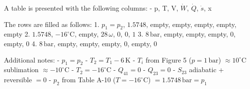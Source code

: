A table is presented with the following columns:  
- p, T, V, \( \dot{W} \), \( \dot{Q} \), \( \dot{s} \), x  

The rows are filled as follows:  
1. \( p_1 = p_2 \), \( 1.5748 \), empty, empty, empty, empty, empty  
2. \( 1.5748 \), \( -16^\circ \text{C} \), empty, \( 28 \, \omega \), \( 0 \), \( 0 \), \( 1 \)  
3. \( 8 \, \text{bar} \), empty, empty, empty, \( 0 \), empty, \( 0 \)  
4. \( 8 \, \text{bar} \), empty, empty, empty, \( 0 \), empty, \( 0 \)  

Additional notes:  
- \( p_1 = p_2 \)  
- \( T_2 = T_1 - 6 \, \text{K} \)  
- \( T_i \) from Figure 5 (\( p = 1 \, \text{bar} \)) \( \approx 10^\circ \text{C} \) sublimation \( \approx -10^\circ \text{C} \)  
- \( T_2 = -16^\circ \text{C} \)  
- \( Q_{41} = 0 \)  
- \( Q_{23} = 0 \)  
- \( S_{23} \) adiabatic + reversible \( = 0 \)  
- \( p_2 \) from Table A-10 (\( T = -16^\circ \text{C} \)) \( = 1.5748 \, \text{bar} = p_1 \)